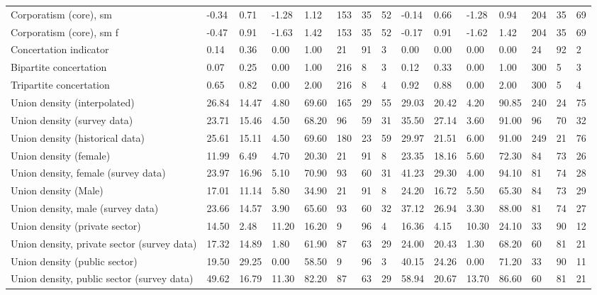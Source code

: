 \begin{longtable}{lllllllllllllll}
\addlinespace
Corporatism (core), sm & -0.34 & 0.71 & -1.28 & 1.12 & 153 & 35 & 52 & -0.14 & 0.66 & -1.28 & 0.94 & 204 & 35 & 69\\
Corporatism (core), sm f & -0.47 & 0.91 & -1.63 & 1.42 & 153 & 35 & 52 & -0.17 & 0.91 & -1.62 & 1.42 & 204 & 35 & 69\\
Concertation indicator & 0.14 & 0.36 & 0.00 & 1.00 & 21 & 91 & 3 & 0.00 & 0.00 & 0.00 & 0.00 & 24 & 92 & 2\\
Bipartite concertation & 0.07 & 0.25 & 0.00 & 1.00 & 216 & 8 & 3 & 0.12 & 0.33 & 0.00 & 1.00 & 300 & 5 & 3\\
Tripartite concertation & 0.65 & 0.82 & 0.00 & 2.00 & 216 & 8 & 4 & 0.92 & 0.88 & 0.00 & 2.00 & 300 & 5 & 4\\
\addlinespace
Union density (interpolated) & 26.84 & 14.47 & 4.80 & 69.60 & 165 & 29 & 55 & 29.03 & 20.42 & 4.20 & 90.85 & 240 & 24 & 75\\
Union density (survey data) & 23.71 & 15.46 & 4.50 & 68.20 & 96 & 59 & 31 & 35.50 & 27.14 & 3.60 & 91.00 & 96 & 70 & 32\\
Union density (historical data) & 25.61 & 15.11 & 4.50 & 69.60 & 180 & 23 & 59 & 29.97 & 21.51 & 6.00 & 91.00 & 249 & 21 & 76\\
Union density (female) & 11.99 & 6.49 & 4.70 & 20.30 & 21 & 91 & 8 & 23.35 & 18.16 & 5.60 & 72.30 & 84 & 73 & 26\\
Union density, female (survey data) & 23.97 & 16.96 & 5.10 & 70.90 & 93 & 60 & 31 & 41.23 & 29.30 & 4.00 & 94.10 & 81 & 74 & 28\\
\addlinespace
Union density (Male) & 17.01 & 11.14 & 5.80 & 34.90 & 21 & 91 & 8 & 24.20 & 16.72 & 5.50 & 65.30 & 84 & 73 & 29\\
Union density, male (survey data) & 23.66 & 14.57 & 3.90 & 65.60 & 93 & 60 & 32 & 37.12 & 26.94 & 3.30 & 88.00 & 81 & 74 & 27\\
Union density (private sector) & 14.50 & 2.48 & 11.20 & 16.20 & 9 & 96 & 4 & 16.36 & 4.15 & 10.30 & 24.10 & 33 & 90 & 12\\
Union density, private sector (survey data) & 17.32 & 14.89 & 1.80 & 61.90 & 87 & 63 & 29 & 24.00 & 20.43 & 1.30 & 68.20 & 60 & 81 & 21\\
Union density (public sector) & 19.50 & 29.25 & 0.00 & 58.50 & 9 & 96 & 3 & 40.15 & 24.26 & 0.00 & 71.20 & 33 & 90 & 11\\
\addlinespace
Union density, public sector (survey data) & 49.62 & 16.79 & 11.30 & 82.20 & 87 & 63 & 29 & 58.94 & 20.67 & 13.70 & 86.60 & 60 & 81 & 21\\

\end{longtable}

